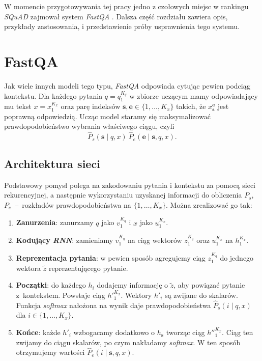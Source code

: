 W momencie przygotowywania tej pracy jedno z czołowych miejsc w rankingu \textit{SQuAD} zajmował system \textit{FastQA} \cite{fastqa}. Dalsza część rozdziału zawiera opis, przykłady zastosowania, i przedstawienie próby usprawnienia tego systemu.


\section{FastQA}

Jak wiele innych modeli tego typu, \textit{FastQA} odpowiada cytując pewien podciąg kontekstu. Dla każdego pytania $q = q_1^{K_q}$ w zbiorze uczącym mamy odpowiadający mu tekst $x = x_1^{K_x}$ oraz parę indeksów $\mathbf{s}, \mathbf{e} \in \{1,\dots,K_x\}$ takich, że $x_{\mathbf{s}}^{\mathbf{e}}$ jest poprawną odpowiedzią. Ucząc model staramy się maksymalizować prawdopodobieństwo wybrania właściwego ciągu, czyli
\[\hat{P}_s(\mathbf{s} \mid q, x)\ \hat{P}_e(\mathbf{e} \mid \mathbf{s}, q, x).\]


\subsection{Architektura sieci}

Podstawowy pomysł polega na zakodowaniu pytania i kontekstu za pomocą sieci rekurencyjnej, a następnie wykorzystaniu uzyskanej informacji do obliczenia $P_s$,~$P_e$~--~rozkładów prawdopodobieństwa na $\{1,\dots,K_x\}$. Można zrealizować go tak:

\begin{enumerate}
    \item \textbf{Zanurzenia}: zanurzamy $q$ jako $v_1^{K_q}$ i $x$ jako $u_1^{K_x}$.
    \item \textbf{Kodujący \textit{RNN}}: zamieniamy $v_1^{K_q}$ na ciąg wektorów $z_1^{K_q}$ oraz $u_1^{K_x}$ na $h_1^{K_x}$.
    \item \textbf{Reprezentacja pytania}: w pewien sposób agregujemy ciąg $z_1^{K_q}$ do jednego wektora $\tilde{z}$ reprezentującego pytanie.
    \item \textbf{Początki}: do każdego $h_i$ dodajemy informację o $\tilde{z}$, aby powiązać pytanie z~kontekstem. Powstaje ciąg ${h'}_1^{K_x}$. Wektory $h'_i$ są zwijane do skalarów. Funkcja \textit{softmax} nałożona na wynik daje prawdopodobieństwa $\hat{P}_s(i \mid q, x)$ dla $i \in \{1,\dots,K_x\}$.
    \item \textbf{Końce}: każde $h'_i$ wzbogacamy dodatkowo o $h_{\mathbf{s}}$ tworząc ciąg ${h''}_1^{K_x}$. Ciąg ten zwijamy do ciągu skalarów, po czym nakładamy \textit{softmax}. W ten sposób otrzymujemy wartości $\hat{P}_e(i \mid \mathbf{s}, q, x)$.
\end{enumerate}

